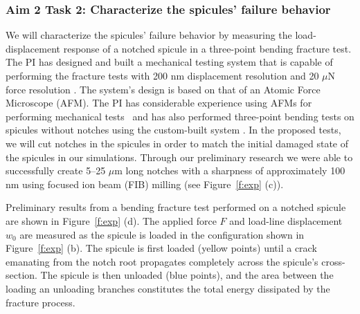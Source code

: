 \documentclass[10pt,letterpaper]{article}
\begin{document}
    \subsubsection{Aim 2 Task 2: Characterize the spicules' failure behavior}
      We will characterize the spicules' failure behavior by measuring the load-displacement response of a notched spicule in a three-point bending fracture test.
      The PI has designed and built a mechanical testing system that is capable of performing the fracture tests with 200 nm displacement resolution and 20 $\mu$N force resolution \cite{monn2017enhanced,monn2017JoVE}. The system's design is based on that of an Atomic Force Microscope (AFM). The PI has considerable experience using AFMs for performing mechanical tests~\cite{kesari2010role,kesari2011mechanics} and has also performed three-point bending tests on spicules without notches using the custom-built system \cite{monn2017enhanced,monn2017JoVE,monn2017new}.
      In the proposed tests, we will cut notches in the spicules in order to match the initial damaged state of the spicules in our simulations. Through our preliminary research we were able to successfully create 5--25 $\mu$m long notches with a sharpness of approximately 100 nm using focused ion beam (FIB) milling (see Figure~\ref{f:exp} (c)).

      Preliminary results from a bending fracture test performed on a notched spicule are shown in Figure~\ref{f:exp} (d). The applied force $F$ and load-line displacement $w_0$ are measured as the spicule is loaded in the configuration shown in Figure~\ref{f:exp} (b). The spicule is first loaded (yellow points) until a crack emanating from the notch root propagates completely across the spicule's cross-section. The spicule is then unloaded (blue points), and the area between the loading an unloading branches constitutes the total energy dissipated by the fracture process.
\end{document}

